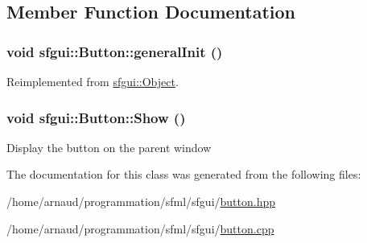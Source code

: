 \subsection{Member Function Documentation}
\hypertarget{classsfgui_1_1Button_59849e58ed4c46061d71f7172cab4e4e}{
\subsubsection[generalInit]{\setlength{\rightskip}{0pt plus 5cm}void sfgui::Button::generalInit ()}}
\label{classsfgui_1_1Button_59849e58ed4c46061d71f7172cab4e4e}




Reimplemented from \hyperlink{classsfgui_1_1Object_d2750b3d51a3a208739ed6c0c57df6aa}{sfgui::Object}.\hypertarget{classsfgui_1_1Button_94dc6919349ff5ca9f334cce78afbe39}{
\subsubsection[Show]{\setlength{\rightskip}{0pt plus 5cm}void sfgui::Button::Show ()}}
\label{classsfgui_1_1Button_94dc6919349ff5ca9f334cce78afbe39}




Display the button on the parent window 

The documentation for this class was generated from the following files:\begin{CompactItemize}
\item 
/home/arnaud/programmation/sfml/sfgui/\hyperlink{button_8hpp}{button.hpp}\item 
/home/arnaud/programmation/sfml/sfgui/\hyperlink{button_8cpp}{button.cpp}\end{CompactItemize}
